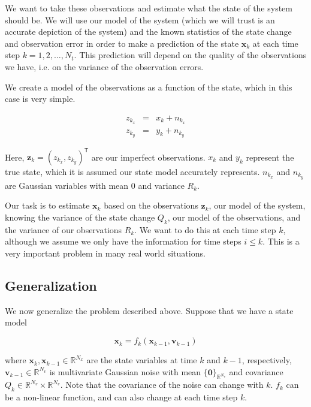\documentclass{article}
\newcommand{\tr}{^\mathsf{T}}
\begin{document}
We want to take these observations and estimate what the state of the system
should be.  We will use our model of the system (which we will trust is an 
accurate depiction of the system) and the known statistics of the state change
and observation error in order to make a prediction of the state $\mathbf{x}_k$
at each time step $k = 1,2,\ldots,N_t$.  This prediction will depend on the 
quality of the observations we have, i.e. on the variance of the observation 
errors.

We create a model of the observations as a function of the state, which 
in this case is very simple.

\[\begin{array}{rcl}
z_{k_x} & = & x_k + n_{k_x} \\
z_{k_y} & = & y_k + n_{k_y}
\end{array}\]

Here, $\mathbf{z}_k = (z_{k_x},z_{k_y})\tr$ are our imperfect observations.  
$x_k$ and $y_k$ represent the true state, which it is assumed our state model 
accurately represents.  $n_{k_x}$ and $n_{k_y}$ are Gaussian variables with
mean $0$ and variance $R_k$. 

Our task is to estimate $\mathbf{x}_k$ based on the observations $\mathbf{z}_k$,
our model of the system, knowing the variance of the state change $Q_k$, 
our model of the observations, and the variance of our observations $R_k$.  We
want to do this at each time step $k$, although we assume we only have the 
information for time steps $i \le k$.  This is a very important problem in 
many real world situations.

\subsection{Generalization}

We now generalize the problem described above.  Suppose that we have a state
model

\[\mathbf{x}_k = f_k(\mathbf{x}_{k-1}, \mathbf{v}_{k-1})\]

where $\mathbf{x}_k, \mathbf{x}_{k-1} \in \mathbb{R}^{N_x}$ are the state
variables at time $k$ and $k-1$, respectively, 
$\mathbf{v}_{k-1} \in \mathbb{R}^{N_{v}}$ is 
multivariate Gaussian noise with mean $\{\mathbf{0}\}_{\mathbb{R}^{N_v}}$ and 
covariance $Q_k \in \mathbb{R}^{N_v} \times \mathbb{R}^{N_v}$.  Note that the 
covariance of the noise can change with $k$.  $f_k$ can be a non-linear 
function, and can also change at each time step $k$.
\end{document}
